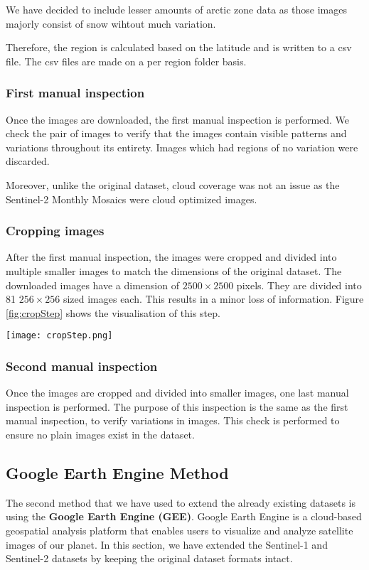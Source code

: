 We have decided to include lesser amounts of arctic zone data as those images majorly consist of snow wihtout much variation.

Therefore, the region is calculated based on the latitude and is written to a csv file. The csv files are made on a per region folder basis.

\subsubsection{First manual inspection}
Once the images are downloaded, the first manual inspection is performed. We check the pair of images to verify that the images contain visible patterns and variations throughout its entirety. Images which had regions of no variation were discarded.

Moreover, unlike the original dataset, cloud coverage was not an issue as the Sentinel-2 Monthly Mosaics were cloud optimized images.

\subsubsection{Cropping images}
After the first manual inspection, the images were cropped and divided into multiple smaller images to match the dimensions of the original dataset. The downloaded images have a dimension of $2500\times2500$ pixels. They are divided into 81 $256\times256$ sized images each. This results in a minor loss of information. Figure \ref{fig:cropStep} shows the visualisation of this step.

\begin{figure*}
    \texttt{[image: cropStep.png]}
    \caption{Image demonstrating the step of cropping and dividing the large image into smaller images.}
    \label{fig:cropStep}
\end{figure*}

\subsubsection{Second manual inspection}
Once the images are cropped and divided into smaller images, one last manual inspection is performed. The purpose of this inspection is the same as the first manual inspection, to verify variations in images. This check is performed to ensure no plain images exist in the dataset.

\subsection{Google Earth Engine Method}
The second method that we have used to extend the already existing datasets is using the \textbf{Google Earth Engine (GEE)}. Google Earth Engine is a cloud-based geospatial analysis platform that enables users to visualize and analyze satellite images of our planet. In this section, we have extended the Sentinel-1 and Sentinel-2 datasets by keeping the original dataset formats intact.

